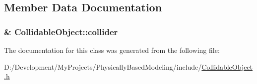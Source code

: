 \subsection{Member Data Documentation}
\hypertarget{class_collidable_object_afb18f5beeecf133e186219aecbde3b64}{
\subsubsection[{collider}]{\& Collidable\-Object\-::collider\hspace{0.3cm}{\ttfamily [protected]}}}\label{class_collidable_object_afb18f5beeecf133e186219aecbde3b64}


The documentation for this class was generated from the following file\-:\begin{DoxyCompactItemize}
\item 
D\-:/\-Development/\-My\-Projects/\-Physically\-Based\-Modeling/include/\hyperlink{_collidable_object_8h}{Collidable\-Object.\-h}\end{DoxyCompactItemize}
